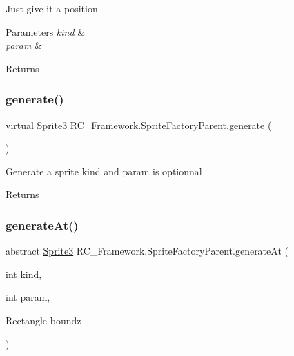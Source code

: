 Just give it a position 


\begin{DoxyParams}{Parameters}
{\em kind} & \\
\hline
{\em param} & \\
\hline
\end{DoxyParams}
\begin{DoxyReturn}{Returns}

\end{DoxyReturn}
\mbox{\label{class_r_c___framework_1_1_sprite_factory_parent_a0149ef937b4d172caf252112939fafa2}} 
\subsubsection{\texorpdfstring{generate()}{generate()}\hspace{0.1cm}{\footnotesize\ttfamily [3/3]}}
{\footnotesize\ttfamily virtual \mbox{\hyperlink{class_r_c___framework_1_1_sprite3}{Sprite3}} R\+C\+\_\+\+Framework.\+Sprite\+Factory\+Parent.\+generate (\begin{DoxyParamCaption}{ }\end{DoxyParamCaption})\hspace{0.3cm}{\ttfamily [virtual]}}



Generate a sprite kind and param is optionnal 

\begin{DoxyReturn}{Returns}

\end{DoxyReturn}
\mbox{\label{class_r_c___framework_1_1_sprite_factory_parent_ace3d0e7a00dd88a16a652ed5fa6a90bd}} 
\subsubsection{\texorpdfstring{generate\+At()}{generateAt()}}
{\footnotesize\ttfamily abstract \mbox{\hyperlink{class_r_c___framework_1_1_sprite3}{Sprite3}} R\+C\+\_\+\+Framework.\+Sprite\+Factory\+Parent.\+generate\+At (\begin{DoxyParamCaption}\item[{int}]{kind,  }\item[{int}]{param,  }\item[{Rectangle}]{boundz }\end{DoxyParamCaption})\hspace{0.3cm}{\ttfamily [pure virtual]}}



